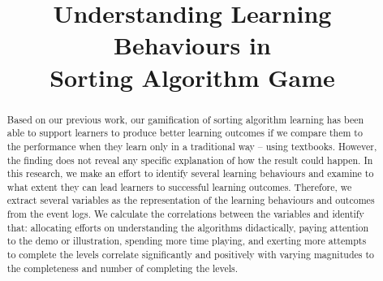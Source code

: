 \documentclass[conference]{IEEEtran}
\begin{document}
\title{Understanding Learning Behaviours in\\
   Sorting Algorithm Game
}

\author{
\and
{}
\and
{}
}

\maketitle

\begin{abstract}
Based on our previous work, our gamification of sorting algorithm learning has been able to support learners to produce better learning outcomes if we compare them to the performance when they learn only in a traditional way – using textbooks. However, the finding does not reveal any specific explanation of how the result could happen. In this research, we make an effort to identify several learning behaviours and examine to what extent they can lead learners to successful learning outcomes. Therefore, we extract several variables as the representation of the learning behaviours and outcomes from the event logs. We calculate the correlations between the variables and identify that: allocating efforts on understanding the algorithms didactically, paying attention to the demo or illustration, spending more time playing, and exerting more attempts to complete the levels correlate significantly and positively with varying magnitudes to the completeness and number of completing the levels.
\end{abstract}
\end{document}
